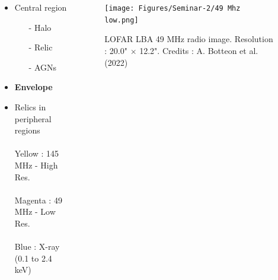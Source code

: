 \documentclass[aspectratio=169]{beamer}
\begin{document}
\begin{markdown}
\begin{frame}{}


\begin{columns}
    \begin{column}{0.3\textwidth} 
         \begin{itemize}
             \item Central region
                \begin{itemize}
                    \item[-] Halo
                    \item[-] Relic
                    \item[-] AGNs
                \end{itemize} 
             \item {\textbf{Envelope}}
             \item Relics in peripheral regions 
             \\\\ \vspace{16mm} \hspace{-4mm}
             \scriptsize{
             Yellow : 145 MHz - High Res. \\\\ \hspace{-3mm}
             Magenta : 49 MHz - Low Res.\\\\ \hspace{-3mm}
             Blue : X-ray (0.1 to 2.4 keV)}
        \end{itemize}
    \end{column}
    \begin{column}{0.8\textwidth}
         \vspace{-2mm}
          \begin{figure}[!htbp]
          \centering
          \texttt{[image: Figures/Seminar-2/49 Mhz low.png]}
          \vspace*{-3mm}
          \caption{LOFAR LBA 49 MHz radio image. Resolution : 20.0" $\times$ 12.2". Credits :  A. Botteon et al. (2022)}
          \label{}
        \end{figure}
    \end{column}
\end{columns}

\end{frame}



\end{markdown}
\end{document}
